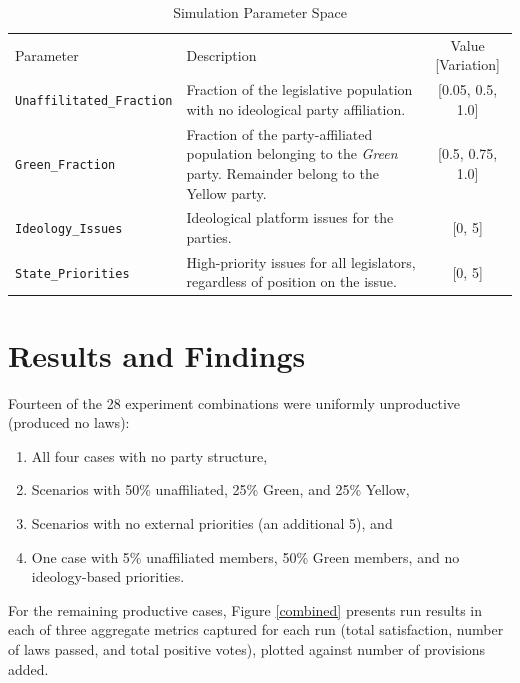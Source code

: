 \documentclass[pdftex,12pt,oribibl]{llncs}
\begin{document}
\begin{table}
 \caption{Simulation Parameter Space}
 \begin{tabular}{lp{2.25in}c}
 \hline\noalign{\smallskip}
 Parameter & Description & Value [Variation] \\
 \noalign{\smallskip}
 \hline
 \noalign{\smallskip}
 \texttt{Unaffilitated\_Fraction} & Fraction of the legislative population with no ideological party  affiliation. & [0.05, 0.5, 1.0] \\
 \texttt{Green\_Fraction} & Fraction of the party-affiliated population belonging to the \textit{Green} party. Remainder belong to the Yellow party. & [0.5, 0.75, 1.0] \\
 \texttt{Ideology\_Issues} & Ideological platform issues for the parties. & [0, 5] \\
 \texttt{State\_Priorities} & High-priority issues for all legislators, regardless of position on the issue. & [0, 5] \\
 \hline
 \end{tabular}
 \label{params}
\end{table}

\section{Results and Findings}
%
Fourteen of the 28 experiment combinations were uniformly unproductive (produced no laws):

\begin{enumerate}
\item All four cases with no party structure,
\item Scenarios with 50\% unaffiliated, 25\% Green, and 25\% Yellow,
\item Scenarios with no external priorities (an additional 5), and
\item One case with 5\% unaffiliated members, 50\% Green members, and no ideology-based priorities.
\end{enumerate}
For the remaining productive cases, Figure \ref{combined} presents run results in each of three aggregate metrics captured for each run (total satisfaction, number of laws passed, and total positive votes), plotted against number of provisions added. 
\end{document}
